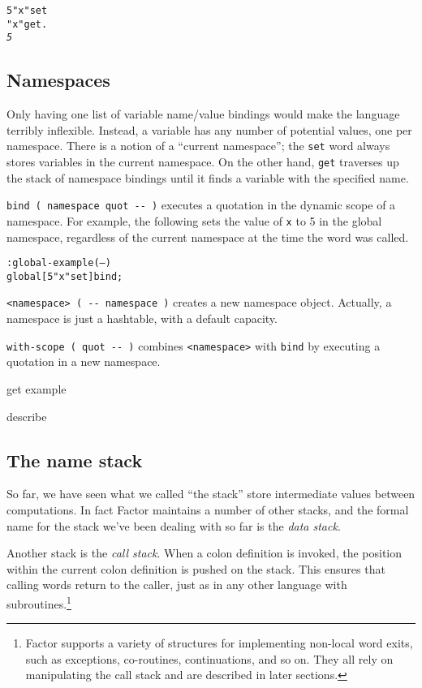 \documentclass[english]{article}
\begin{document}
\begin{alltt}
5 "x" set
"x" get .
\emph{5}
\end{alltt}

\subsection{Namespaces}

Only having one list of variable name/value bindings would make the language terribly inflexible. Instead, a variable has any number of potential values, one per namespace. There is a notion of a ``current namespace''; the \texttt{set} word always stores variables in the current namespace. On the other hand, \texttt{get} traverses up the stack of namespace bindings until it finds a variable with the specified name.

\texttt{bind ( namespace quot -{}- )} executes a quotation in the dynamic scope of a namespace. For example, the following sets the value of \texttt{x} to 5 in the global namespace, regardless of the current namespace at the time the word was called.

\begin{alltt}
: global-example ( -- )
    global {[} 5 "x" set {]} bind ;
\end{alltt}

\texttt{<namespace> ( -{}- namespace )} creates a new namespace object. Actually, a namespace is just a hashtable, with a default capacity.

\texttt{with-scope ( quot -{}- )} combines \texttt{<namespace>} with \texttt{bind} by executing a quotation in a new namespace.

get example

describe

\subsection{The name stack}

So far, we have seen what we called ``the stack'' store intermediate values between computations. In fact Factor maintains a number of other stacks, and the formal name for the stack we've been dealing with so far is the \emph{data stack}.

Another stack is the \emph{call stack}. When a colon definition is invoked, the position within the current colon definition is pushed on the stack. This ensures that calling words return to the caller, just as in any other language with subroutines.\footnote{Factor supports a variety of structures for implementing non-local word exits, such as exceptions, co-routines, continuations, and so on. They all rely on manipulating the call stack and are described in later sections.}
\end{document}
